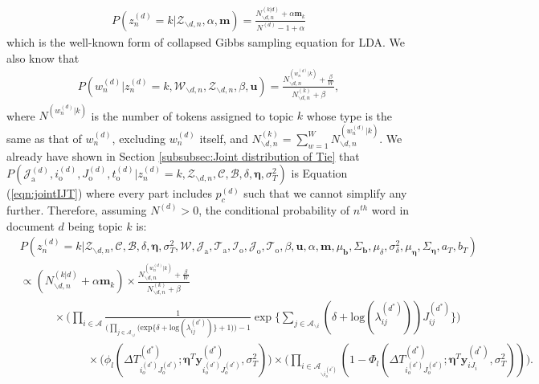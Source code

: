   \begin{equation}
   \begin{aligned} 
   P(z^{(d)}_n=k|\mathcal{Z}_{\backslash d, n}, \alpha, \boldsymbol{m})=\frac{N^{(k|d)}_{\backslash d, n}+\alpha \boldsymbol{m}_k}{N^{(d)}-1+\alpha}
   \end{aligned}
   \end{equation}
   which is the well-known form of collapsed Gibbs sampling equation for LDA. We also know that \begin{equation}
   \begin{aligned} 
   P(w^{(d)}_n|z^{(d)}_n=k, \mathcal{W}_{\backslash d, n}, \mathcal{Z}_{\backslash d, n}, \beta, \boldsymbol{u} )=\frac{N^{(w_n^{(d)}|k)}_{\backslash d, n}+\frac{\beta}{W} }{N^{(k)}_{\backslash d, n}+\beta},
   \end{aligned}
   \end{equation}
   where $N^{(w_n^{(d)}|k)}$ is the number of tokens assigned to topic $k$ whose type is the same as that of $w_n^{(d)}$, excluding $w_n^{(d)}$ itself, and $N^{(k)}_{\backslash d, n}=\sum_{w=1}^W N_{\backslash d, n}^{(w_n^{(d)}|k)}$. We already have shown in Section \ref{subsubsec:Joint distribution of Tie} that
 $P(\mathcal{J}^{(d)}_{\mbox{a}}, i^{(d)}_{\mbox{o}}, J^{(d)}_{\mbox{o}}, t^{(d)}_{\mbox{o}}| z^{(d)}_n=k, \mathcal{Z}_{\backslash d, n}, \mathcal{C}, \mathcal{B}, \delta, \boldsymbol{\eta}, \sigma_T^2)$ is Equation (\ref{eqn:jointIJT})
   where every part includes $p_c^{(d)}$ such that we cannot simplify any further. Therefore, assuming $N^{(d)} > 0$, the conditional probability of $n^{th}$ word in document $d$ being topic $k$ is:
   \begin{equation}
   \begin{aligned}
   &P(z^{(d)}_n=k|\mathcal{Z}_{\backslash d, n},   \mathcal{C},   \mathcal{B}, \delta,\boldsymbol{\eta}, \sigma_T^2,  \mathcal{W}, \mathcal{J}_{\mbox{a}}, \mathcal{T}_{\mbox{a}},\mathcal{I}_{\mbox{o}}, \mathcal{J}_{\mbox{o}}, \mathcal{T}_{\mbox{o}}, \beta, \boldsymbol{u}, \alpha, \boldsymbol{m},  \mu_{\boldsymbol{b}}, \Sigma_{\boldsymbol{b}}, \mu_\delta, \sigma^2_\delta, \mu_{\boldsymbol{\eta}}, \Sigma_{\boldsymbol{\eta}}, a_T, b_T)\\&\propto (N^{(k|d)}_{\backslash d, n}+\alpha \boldsymbol{m}_k)\times \frac{N^{(w_n^{(d)}|k)}_{\backslash d, n}+\frac{\beta}{W} }{N^{(k)}_{\backslash d, n}+\beta}\\&\quad\quad\quad\times
   \Big(\prod_{i\in \mathcal{A}} \frac{1}{\Big(\prod_{j \in \mathcal{A}_{\backslash i}} \Big(\mbox{exp}\{\delta+\mbox{log}(\lambda_{ij}^{(d^*)})\} + 1\Big)\Big)-1}\exp\Big\{\sum_{j \in \mathcal{A}_{\backslash i}} (\delta+\mbox{log}(\lambda_{ij}^{(d^*)}))J_{ij}^{(d^*)} \Big\}\Big) \\&\quad\quad\quad\quad\quad\quad\times   \Big(\phi_l(\Delta T^{(d^*)}_{i_o^{(d^*)}J_o^{(d^*)}}; \boldsymbol{\eta}^T\boldsymbol{y}^{(d^*)}_{i_o^{(d^*)}J_o^{(d^*)}}, \sigma_T^2)\Big)\times \Big( \prod_{i\in \mathcal{A}_{\backslash i_o^{(d^*)}}} (1 - \Phi_l(\Delta T^{(d^*)}_{i_o^{(d^*)}J_o^{(d^*)}};\boldsymbol{\eta}^T\boldsymbol{y}^{(d^*)}_{iJ_i}, \sigma_T^2))\Big).
   \end{aligned}
   \end{equation}
   
